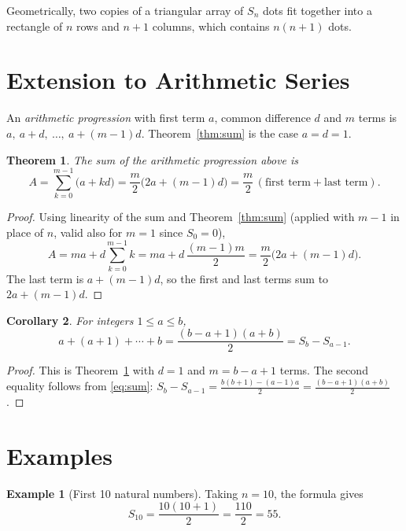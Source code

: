 \documentclass[12pt,a4paper]{article}
\newtheorem{theorem}{Theorem}
\newtheorem{corollary}[theorem]{Corollary}
\theoremstyle{definition}
\newtheorem{example}{Example}
\begin{document}
Geometrically, two copies of a triangular array of $S_n$ dots fit together into a rectangle of $n$ rows and $n+1$ columns, which contains $n(n+1)$ dots.
 
\section{Extension to Arithmetic Series}\label{sec:arithmetic}
 
An \emph{arithmetic progression} with first term $a$, common difference $d$ and $m$ terms is $a,\ a+d,\ \ldots,\ a+(m-1)d$. Theorem~\ref{thm:sum} is the case $a=d=1$.
 
\begin{theorem}\label{thm:arith}
The sum of the arithmetic progression above is
\[
A=\sum_{k=0}^{m-1}\bigl(a+kd\bigr)=\frac{m}{2}\bigl(2a+(m-1)d\bigr)=\frac{m}{2}\,(\text{first term}+\text{last term}).
\]
\end{theorem}
 
\begin{proof}
Using linearity of the sum and Theorem~\ref{thm:sum} (applied with $m-1$ in place of $n$, valid also for $m=1$ since $S_0=0$),
\[
A = ma + d\sum_{k=0}^{m-1}k = ma + d\,\frac{(m-1)m}{2} = \frac{m}{2}\bigl(2a+(m-1)d\bigr).
\]
The last term is $a+(m-1)d$, so the first and last terms sum to $2a+(m-1)d$. \qedhere
\end{proof}
 
\begin{corollary}\label{cor:range}
For integers $1\le a\le b$,
\[
a+(a+1)+\cdots+b=\frac{(b-a+1)(a+b)}{2}=S_b-S_{a-1}.
\]
\end{corollary}
 
\begin{proof}
This is Theorem~\ref{thm:arith} with $d=1$ and $m=b-a+1$ terms. The second equality follows from \eqref{eq:sum}: $S_b-S_{a-1}=\frac{b(b+1)-(a-1)a}{2}=\frac{(b-a+1)(a+b)}{2}$.
\end{proof}
 
\section{Examples}
 
\begin{example}[First 10 natural numbers]
Taking $n=10$, the formula gives
\[
S_{10}=\frac{10(10+1)}{2}=\frac{110}{2}=55.
\]
\end{example} %
 
\end{document}
